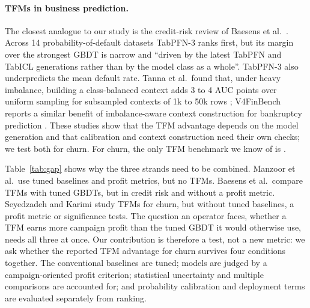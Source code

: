 \documentclass[11pt]{article}
\newcommand{\tfm}{TFM\xspace}
\newcommand{\tfms}{TFMs\xspace}
\begin{document}
\paragraph{\tfms in business prediction.}
The closest analogue to our study is the credit-risk review of Baesens et al.\ \cite{baesens2026creditrisk}. Across
14 probability-of-default datasets TabPFN-3 ranks first, but its margin over the strongest GBDT is narrow and ``driven
by the latest TabPFN and TabICL generations rather than by the model class as a whole''. TabPFN-3 also underpredicts
the mean default rate. Tanna et al.\ found that, under heavy imbalance, building a class-balanced context adds 3 to 4 AUC
points over uniform sampling for subsampled contexts of 1k to 50k rows \cite{tanna2026resampling}; V4FinBench reports
a similar benefit of imbalance-aware context construction for bankruptcy prediction \cite{kostrzewa2026v4finbench}.
These studies show that the \tfm advantage depends on the model generation and that calibration and context
construction need their own checks; we test both for churn. For churn, the only \tfm benchmark we know of is
\cite{seyedzadeh2026churn}.

Table~\ref{tab:gap} shows why the three strands need to be combined. Manzoor et al.\ use tuned baselines and profit
metrics, but no \tfms. Baesens et al.\ compare \tfms with tuned GBDTs, but in credit risk and without a profit metric.
Seyedzadeh and Karimi study \tfms for churn, but without tuned baselines, a profit metric or significance tests. The
question an operator faces, whether a \tfm earns more campaign profit than the tuned GBDT it would otherwise use, needs
all three at once. Our contribution is therefore a test, not a new metric: we ask whether the reported \tfm advantage
for churn survives four conditions together. The conventional baselines are tuned; models are judged by a
campaign-oriented profit criterion; statistical uncertainty and multiple comparisons are accounted for; and
probability calibration and deployment terms are evaluated separately from ranking.
\end{document}
